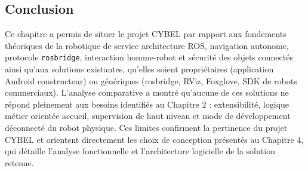 \subsection{Conclusion}
\label{subsec:conclusion_etat_art}

Ce chapitre a permis de situer le projet CYBEL par rapport aux fondements
théoriques de la robotique de service architecture ROS, navigation
autonome, protocole \texttt{rosbridge}, interaction homme-robot et sécurité
des objets connectés ainsi qu'aux solutions existantes, qu'elles soient
propriétaires (application Android constructeur) ou génériques (rosbridge,
RViz, Foxglove, SDK de robots commerciaux). L'analyse comparative a montré
qu'aucune de ces solutions ne répond pleinement aux besoins identifiés au
Chapitre 2 : extensibilité, logique métier orientée accueil, supervision
de haut niveau et mode de développement déconnecté du robot physique. Ces
limites confirment la pertinence du projet CYBEL et orientent directement
les choix de conception présentés au Chapitre 4, qui détaille l'analyse
fonctionnelle et l'architecture logicielle de la solution retenue.